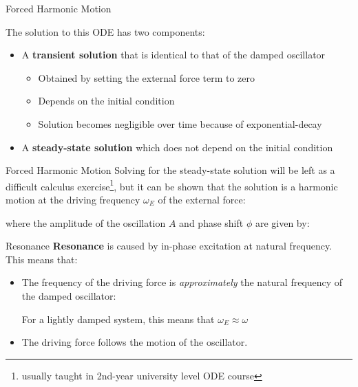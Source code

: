 \documentclass[12pt,compress,aspectratio=169]{beamer}
\begin{document}
\begin{frame}{Forced Harmonic Motion}
  
  The solution to this ODE has two components:
  \begin{itemize}
  \item A \textbf{transient solution} that is identical to that of the damped
    oscillator
    \begin{itemize}
    \item Obtained by setting the external force term to zero
    \item Depends on the initial condition
    \item Solution becomes negligible over time because of exponential-decay
    \end{itemize}
  \item A \textbf{steady-state solution} which does not depend on the initial
    condition
  \end{itemize}
\end{frame}



\begin{frame}{Forced Harmonic Motion}
  Solving for the steady-state solution will be left as a difficult calculus
  exercise\footnote{usually taught in 2nd-year university level ODE course},
  but it can be shown that the solution is a harmonic motion at the driving
  frequency $\omega_E$ of the external force:

  
  \vspace{-.1in}where the amplitude of the oscillation $A$ and phase shift
  $\phi$ are given by:

  \vspace{.3in}
\end{frame}



\begin{frame}{Resonance}
  \textbf{Resonance} is caused by in-phase excitation at natural frequency.
  This means that:
  \begin{itemize}
  \item The frequency of the driving force is \emph{approximately} the natural
    frequency of the damped oscillator:


    For a lightly damped system, this means that $\omega_E\approx\omega$
    
  \item The driving force follows the motion of the oscillator.
  \end{itemize}
\end{frame}
\end{document}

